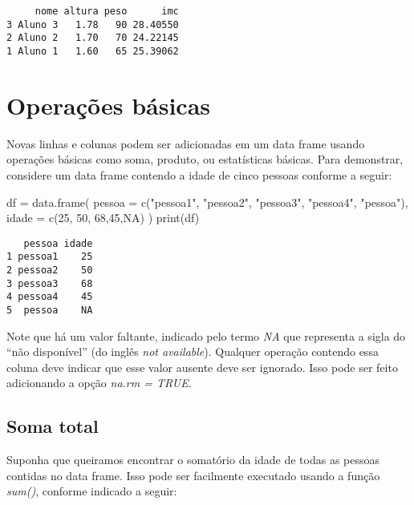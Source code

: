 \documentclass[
  letterpaper,
  DIV=11,
  numbers=noendperiod]{scrreprt}
\newenvironment{Shaded}{\begin{snugshade}}{\end{snugshade}}
\newcommand{\AttributeTok}[1]{\textcolor[rgb]{0.40,0.45,0.13}{#1}}
\newcommand{\ConstantTok}[1]{\textcolor[rgb]{0.56,0.35,0.01}{#1}}
\newcommand{\DecValTok}[1]{\textcolor[rgb]{0.68,0.00,0.00}{#1}}
\newcommand{\FunctionTok}[1]{\textcolor[rgb]{0.28,0.35,0.67}{#1}}
\newcommand{\NormalTok}[1]{\textcolor[rgb]{0.00,0.23,0.31}{#1}}
\newcommand{\OtherTok}[1]{\textcolor[rgb]{0.00,0.23,0.31}{#1}}
\newcommand{\StringTok}[1]{\textcolor[rgb]{0.13,0.47,0.30}{#1}}
\begin{document}
\begin{verbatim}
     nome altura peso      imc
3 Aluno 3   1.78   90 28.40550
2 Aluno 2   1.70   70 24.22145
1 Aluno 1   1.60   65 25.39062
\end{verbatim}

\section{Operações básicas}\label{operauxe7uxf5es-buxe1sicas}

Novas linhas e colunas podem ser adicionadas em um data frame usando
operações básicas como soma, produto, ou estatísticas básicas. Para
demonstrar, considere um data frame contendo a idade de cinco pessoas
conforme a seguir:

\begin{Shaded}
\begin{Highlighting}[]
\NormalTok{df }\OtherTok{=} \FunctionTok{data.frame}\NormalTok{(}
  \AttributeTok{pessoa =} \FunctionTok{c}\NormalTok{(}\StringTok{"pessoa1"}\NormalTok{, }\StringTok{"pessoa2"}\NormalTok{, }\StringTok{"pessoa3"}\NormalTok{, }\StringTok{"pessoa4"}\NormalTok{, }\StringTok{"pessoa"}\NormalTok{),}
  \AttributeTok{idade =} \FunctionTok{c}\NormalTok{(}\DecValTok{25}\NormalTok{, }\DecValTok{50}\NormalTok{, }\DecValTok{68}\NormalTok{,}\DecValTok{45}\NormalTok{,}\ConstantTok{NA}\NormalTok{)}
\NormalTok{)}
\FunctionTok{print}\NormalTok{(df)}
\end{Highlighting}
\end{Shaded}

\begin{verbatim}
   pessoa idade
1 pessoa1    25
2 pessoa2    50
3 pessoa3    68
4 pessoa4    45
5  pessoa    NA
\end{verbatim}

Note que há um valor faltante, indicado pelo termo \emph{NA} que
representa a sigla do ``não disponível'' (do inglês \emph{not
available}). Qualquer operação contendo essa coluna deve indicar que
esse valor ausente deve ser ignorado. Isso pode ser feito adicionando a
opção \emph{na.rm = TRUE}.

\subsection{Soma total}\label{soma-total}

Suponha que queiramos encontrar o somatório da idade de todas as pessoas
contidas no data frame. Isso pode ser facilmente executado usando a
função \emph{sum()}, conforme indicado a seguir:
\end{document}
